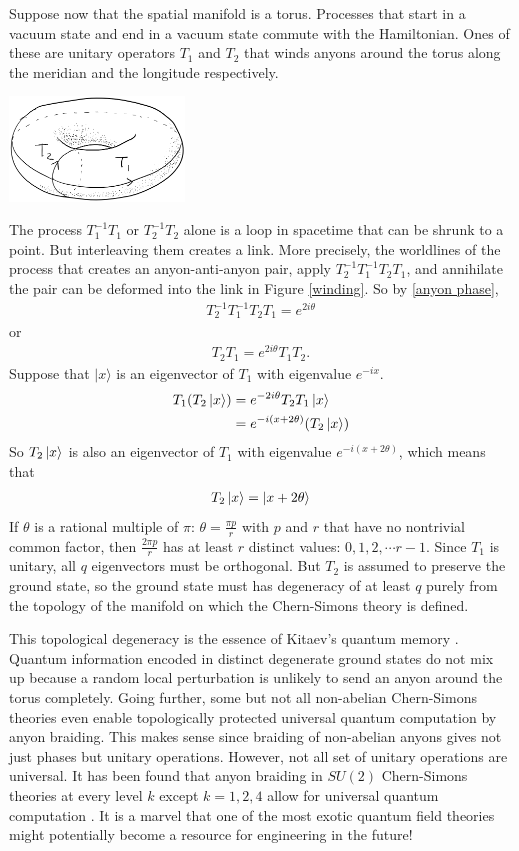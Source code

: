 \documentclass[aps,nofootinbib]{revtex4}
\begin{document}
Suppose now that the spatial manifold is a torus. Processes that start in a vacuum state and end in a vacuum state commute with the Hamiltonian. Ones of these are unitary operators $T_1$ and $T_2$ that winds anyons around the torus along the meridian and the longitude respectively.
\begin{center}
\includegraphics[width=0.35\textwidth]{torus.png}
\end{center}
The process $T_1^{-1}T_1$ or $T_2^{-1}T_2$ alone is a loop in spacetime that can be shrunk to a point. But interleaving them creates a link. More precisely, the worldlines of the process that creates an anyon-anti-anyon pair, apply $T_2^{-1} T_1^{-1} T_2 T_1$, and annihilate the pair can be deformed into the link in Figure \ref{winding}. So by \eqref{anyon phase},
\begin{align*}
T_2^{-1} T_1^{-1} T_2 T_1 = e^{2i\theta}
\end{align*}
or
\begin{align}
T_2 T_1 = e^{2i\theta} T_1 T_2.
\end{align}
Suppose that $|x \rangle$ is an eigenvector of $T_1$ with eigenvalue $e^{-ix}$.
\begin{align*}
T_1 (T_2 \ket{x}) &= e^{-2i\theta} T_2 T_1 \ket{x} \\
	&= e^{-i (x + 2\theta)} (T_2 \ket{x})
\end{align*}
So $T_2 \ket{x}$ is also an eigenvector of $T_1$ with eigenvalue $e^{-i (x + 2\theta)}$, which means that
\begin{align}
T_2 \ket{x} = \ket{x+2\theta}
\end{align}
If $\theta$ is a rational multiple of $\pi$: $\theta = \frac{\pi p}{r}$ with $p$ and $r$ that have no nontrivial common factor, then $\frac{2\pi p}{r}$ has at least $r$ distinct values: $0,1,2,\cdots r-1$. Since $T_1$ is unitary, all $q$ eigenvectors must be orthogonal. But $T_2$ is assumed to preserve the ground state, so the ground state must has degeneracy of at least $q$ purely from the topology of the manifold on which the Chern-Simons theory is defined.

This topological degeneracy is the essence of Kitaev's quantum memory \cite{Preskill}. Quantum information encoded in distinct degenerate ground states do not mix up because a random local perturbation is unlikely to send an anyon around the torus completely. Going further, some but not all non-abelian Chern-Simons theories even enable topologically protected universal quantum computation by anyon braiding. This makes sense since braiding of non-abelian anyons gives not just phases but unitary operations. However, not all set of unitary operations are universal. It has been found that anyon braiding in $SU(2)$ Chern-Simons theories at every level $k$ except $k=1,2,4$ allow for universal quantum computation \cite{Pachos12}. It is a marvel that one of the most exotic quantum field theories might potentially become a resource for engineering in the future!
\end{document}

